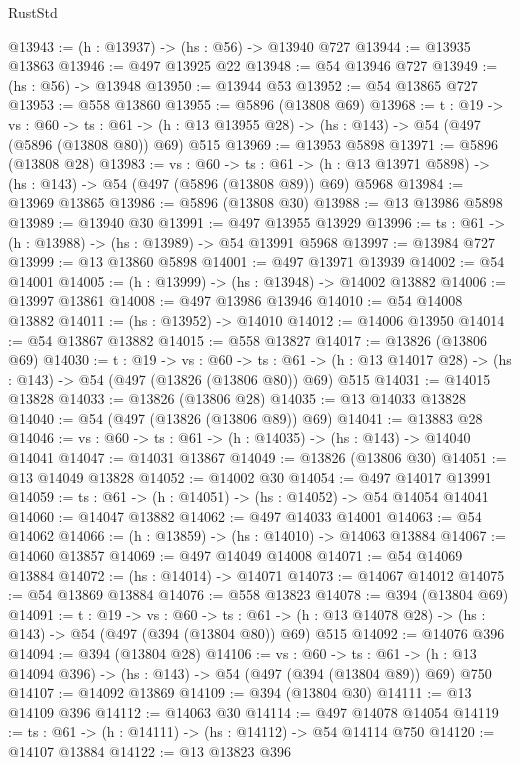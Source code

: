 \begin{lexlean}{RustStd}
\begin{coremodule}
@13943 := (h : @13937) -> (hs : @56) -> @13940 @727
@13944 := @13935 @13863
@13946 := @497 @13925 @22
@13948 := @54 @13946 @727
@13949 := (hs : @56) -> @13948
@13950 := @13944 @53
@13952 := @54 @13865 @727
@13953 := @558 @13860
@13955 := @5896 (@13808 @69)
@13968 := {t : @19} ->
  {vs : @60} ->
  {ts : @61} -> (h : @13 @13955 @28) -> (hs : @143) -> @54 (@497 (@5896 (@13808 @80)) @69) @515
@13969 := @13953 @5898
@13971 := @5896 (@13808 @28)
@13983 := {vs : @60} ->
  {ts : @61} -> (h : @13 @13971 @5898) -> (hs : @143) -> @54 (@497 (@5896 (@13808 @89)) @69) @5968
@13984 := @13969 @13865
@13986 := @5896 (@13808 @30)
@13988 := @13 @13986 @5898
@13989 := @13940 @30
@13991 := @497 @13955 @13929
@13996 := {ts : @61} -> (h : @13988) -> (hs : @13989) -> @54 @13991 @5968
@13997 := @13984 @727
@13999 := @13 @13860 @5898
@14001 := @497 @13971 @13939
@14002 := @54 @14001
@14005 := (h : @13999) -> (hs : @13948) -> @14002 @13882
@14006 := @13997 @13861
@14008 := @497 @13986 @13946
@14010 := @54 @14008 @13882
@14011 := (hs : @13952) -> @14010
@14012 := @14006 @13950
@14014 := @54 @13867 @13882
@14015 := @558 @13827
@14017 := @13826 (@13806 @69)
@14030 := {t : @19} ->
  {vs : @60} ->
  {ts : @61} -> (h : @13 @14017 @28) -> (hs : @143) -> @54 (@497 (@13826 (@13806 @80)) @69) @515
@14031 := @14015 @13828
@14033 := @13826 (@13806 @28)
@14035 := @13 @14033 @13828
@14040 := @54 (@497 (@13826 (@13806 @89)) @69)
@14041 := @13883 @28
@14046 := {vs : @60} -> {ts : @61} -> (h : @14035) -> (hs : @143) -> @14040 @14041
@14047 := @14031 @13867
@14049 := @13826 (@13806 @30)
@14051 := @13 @14049 @13828
@14052 := @14002 @30
@14054 := @497 @14017 @13991
@14059 := {ts : @61} -> (h : @14051) -> (hs : @14052) -> @54 @14054 @14041
@14060 := @14047 @13882
@14062 := @497 @14033 @14001
@14063 := @54 @14062
@14066 := (h : @13859) -> (hs : @14010) -> @14063 @13884
@14067 := @14060 @13857
@14069 := @497 @14049 @14008
@14071 := @54 @14069 @13884
@14072 := (hs : @14014) -> @14071
@14073 := @14067 @14012
@14075 := @54 @13869 @13884
@14076 := @558 @13823
@14078 := @394 (@13804 @69)
@14091 := {t : @19} ->
  {vs : @60} ->
  {ts : @61} -> (h : @13 @14078 @28) -> (hs : @143) -> @54 (@497 (@394 (@13804 @80)) @69) @515
@14092 := @14076 @396
@14094 := @394 (@13804 @28)
@14106 := {vs : @60} ->
  {ts : @61} -> (h : @13 @14094 @396) -> (hs : @143) -> @54 (@497 (@394 (@13804 @89)) @69) @750
@14107 := @14092 @13869
@14109 := @394 (@13804 @30)
@14111 := @13 @14109 @396
@14112 := @14063 @30
@14114 := @497 @14078 @14054
@14119 := {ts : @61} -> (h : @14111) -> (hs : @14112) -> @54 @14114 @750
@14120 := @14107 @13884
@14122 := @13 @13823 @396

\end{coremodule}
\end{lexlean}
